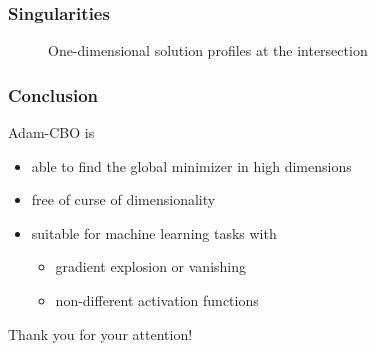 \documentclass[aspectratio=169]{beamer}
\begin{document}
\begin{frame}
\frametitle{Singularities}

\begin{figure}
	\caption{One-dimensional solution profiles at the intersection}
\end{figure}	
\end{frame}

\begin{frame}
\frametitle{Conclusion}

Adam-CBO is
\begin{itemize}
	\item able to find the global minimizer in high dimensions
	\item free of curse of dimensionality
	\item suitable for machine learning tasks with
	\begin{itemize}
		\item gradient explosion or vanishing
		\item non-different activation functions
	\end{itemize}
\end{itemize}
{\huge\medskip
\begin{center}
	Thank you for your attention!
\end{center}
}
\end{frame}
\end{document}
